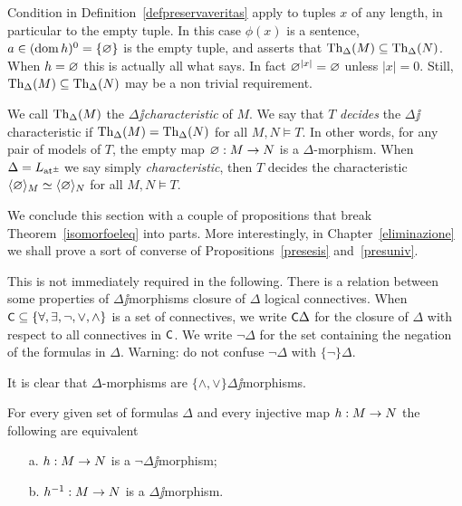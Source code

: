 \documentclass[creche.tex]{subfiles}
\begin{document}
\begin{remark}\label{rmk_characteristic}
Condition  in Definition~\ref{defpreservaveritas} apply to tuples $x$ of any length, in particular to the empty tuple. In this case $\phi(x)$ is a sentence, $a\in(\mathop{\rm dom} h)^0=\{\varnothing\}$ is the empty tuple, and  asserts that $\textrm{Th}_\Delta(M)\subseteq\textrm{Th}_\Delta(N)$. When $h=\varnothing$ this is actually all what  says. In fact $\varnothing^{|x|}=\varnothing$ unless $|x|=0$. Still,  $\textrm{Th}_\Delta(M)\subseteq\textrm{Th}_\Delta(N)$ may be a non trivial requirement.\QED
\end{remark}


\begin{definition}\label{def_characteristic}
We call $\textrm{Th}_\Delta(M)$ the \emph{$\Delta\jj$characteristic} of $M$. We say that $T$  \emph{decides\/} the $\Delta\jj$characteristic if $\textrm{Th}_\Delta(M)=\textrm{Th}_\Delta(N)$ for all $M,N\models T$. In other words, for any pair of models of $T$, the empty map $\varnothing:M\to N$ is a $\Delta$-morphism. When $\Delta=L_{{\tiny\rm at^\pm}}\hskip-.3ex$ we say simply \emph{characteristic}, then $T$ decides the characteristic $\langle\varnothing\rangle_M\simeq\langle\varnothing\rangle_N$ for all $M,N\models T$.\QED
\end{definition}



We conclude this section with a couple of propositions that break Theorem~\ref{isomorfoeleq} into parts. More interestingly, in Chapter~\ref{eliminazione} we shall prove a sort of converse of Propositions~\ref{presesis} and~\ref{presuniv}.

This is not immediately required in the following. There is a relation between some properties of $\Delta\jj$morphisms closure of $\Delta$ logical connectives. When $\textsf{\small C}\subseteq\{\forall,\exists,\neg,\vee,\wedge\}$ is a set of connectives, we write \emph{$\textsf{\small C}\Delta$} for the closure of $\Delta$ with respect to all connectives in $\textsf{\small C}$. We write \emph{$\neg\Delta$} for the set containing the negation of the formulas in $\Delta$. Warning: do not confuse $\neg\Delta$ with $\{\neg\}\Delta$.

It is clear that $\Delta$-morphisms are  $\{\wedge,\vee\}\Delta\jj$morphisms.

\begin{proposition}\label{presneg}
For every given set of formulas $\Delta$ and every injective map $h:M\rightarrow N$ the following are equivalent
\begin{itemize}
\item[a.] $h:M\rightarrow N$ is a $\neg\Delta\jj$morphism;
\item[b.] $h^{-1}:M\rightarrow N$ is a $\Delta\jj$morphism.\QED
\end{itemize}
\end{proposition}
\end{document}
